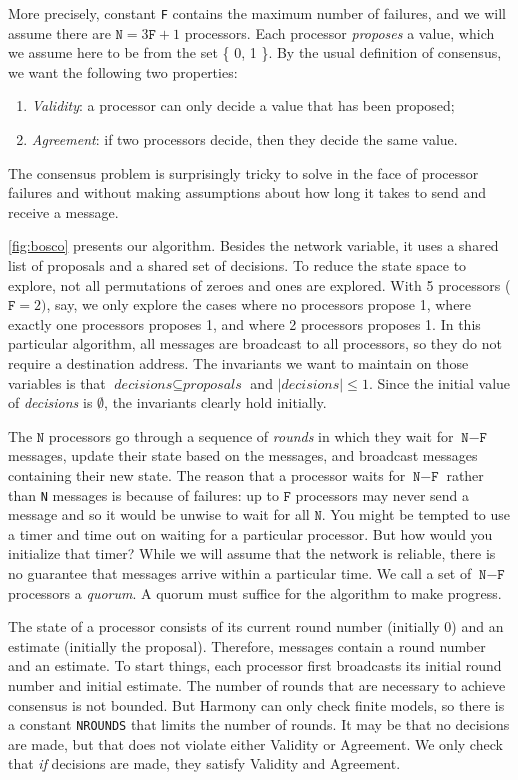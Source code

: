 \documentclass{report}
\begin{document}
{More precisely,
constant \texttt{F} contains the maximum number of failures, and
we will assume there are $\texttt{N} = 3\texttt{F} + 1$ processors.
Each processor \emph{proposes} a value, which we assume here to be from the
set \{ 0, 1 \}.
By the usual definition of consensus, we want the following two properties:
\begin{enumerate}
\item \emph{Validity}: a processor can only decide a value that has been proposed;
\item \emph{Agreement}: if two processors decide, then they decide the same value.
\end{enumerate}
The consensus problem is surprisingly tricky to solve in the face of processor
failures and without making assumptions about how long it takes to send
and receive a message.

\autoref{fig:bosco} presents our algorithm.  Besides the network variable, it uses a
shared list of proposals and a shared set of decisions.
To reduce the state space to explore, not all permutations of zeroes and ones are
explored.  With 5 processors ($\mathtt{F} = 2)$, say, we only explore the cases where
no processors propose 1, where exactly one processors proposes 1, and where 2 processors
proposes 1.
In this particular algorithm, all messages are broadcast to all processors, so they do
not require a destination address.
The invariants we want to maintain
on those variables is that $\textit{decisions} \subseteq \textit{proposals}$
and $|\textit{decisions}| \leq 1$.  Since the initial value of \textit{decisions} is
$\emptyset$, the invariants clearly hold initially.

The $\mathtt{N}$ processors go through a sequence of \emph{rounds} in which they wait for
$\texttt{N} - \texttt{F}$ messages, update their state based on the messages, and
broadcast messages containing their new state.
The reason that a processor waits for $\texttt{N} - \texttt{F}$ rather than \texttt{N}
messages is because of failures: up to $\texttt{F}$ processors may never send a message
and so it would be unwise to wait for all $\texttt{N}$.  You might be tempted to use
a timer and time out on waiting for a particular processor.  But how would you initialize
that timer?  While we will assume that the network is reliable, there is no guarantee
that messages arrive within a particular time.
We call a set of $\texttt{N} - \texttt{F}$ processors a \emph{quorum}.
A quorum must suffice for the algorithm to make progress.

The state of a processor consists of its current round number (initially 0)
and an estimate (initially the proposal).  Therefore, messages contain
a round number and an estimate. To start things, each processor first
broadcasts its initial round number and initial estimate.
The number of rounds that are necessary to achieve consensus is not bounded.  But
Harmony can only check finite models, so there is a constant \texttt{NROUNDS} that
limits the number of rounds.  It may be that no decisions are made, but that does not
violate either Validity or Agreement.  We only check that \emph{if} decisions are
made, they satisfy Validity and Agreement.

}
\end{document}
